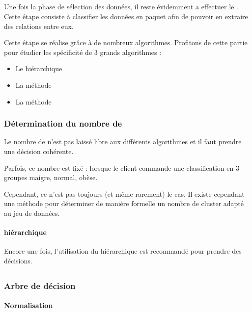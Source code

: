 \subsection{}
Une fois la phase de sélection des données, il reste évidemment a effectuer le . Cette étape consiste à classifier les données en paquet afin de pouvoir en extraire des relations entre eux.

Cette étape se réalise grâce à de nombreux algorithmes. Profitons de cette partie pour étudier les spécificité de 3 grands algorithmes : 
\begin{itemize}
	\item Le  hiérarchique
	\item La méthode 
	\item La méthode 
\end{itemize}

\subsubsection{Détermination du nombre de }
Le nombre de  n'est pas laissé libre aux différents algorithmes et il faut prendre une décision cohérente.

Parfois, ce nombre est fixé : \eg lorsque le client commande une classification en 3 groupes \og maigre\fg, \og normal\fg, \og obèse\fg.

Cependant, ce n'est pas toujours (et même rarement) le cas. Il existe cependant une méthode pour déterminer de manière formelle un nombre de cluster adapté au jeu de données.

\paragraph{ hiérarchique}
Encore une fois, l'utilisation du  hiérarchique est recommandé pour prendre des décisions.

\subsection{}

\subsubsection{}

\subsubsection{}

\subsubsection{}

\subsubsection{Arbre de décision}

\paragraph{Normalisation}
